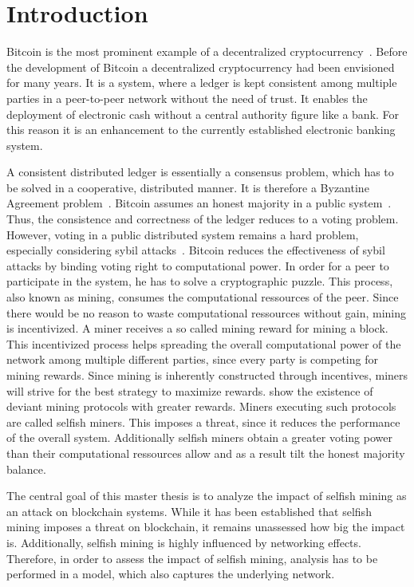 \chapter{Introduction}\label{chap:introduction}
Bitcoin is the most prominent example of a decentralized cryptocurrency~\cite{1}. Before the development of Bitcoin a decentralized cryptocurrency had been envisioned for many years. It is a system, where a ledger is kept consistent among multiple parties in a peer-to-peer network without the need of trust. It enables the deployment of electronic cash without a central authority figure like a bank.
For this reason it is an enhancement to the currently established electronic banking system.

 A consistent distributed ledger is essentially a consensus problem, which has to be solved in a cooperative, distributed manner. It is therefore a Byzantine Agreement problem~\cite{garay2015bitcoin}. Bitcoin assumes an honest majority in a public system~\cite{tschorsch}. Thus, the consistence and correctness of the ledger reduces to a voting problem. However, voting in a public distributed system remains a hard problem, especially considering sybil attacks~\cite{sybil}. Bitcoin reduces the effectiveness of sybil attacks by binding voting right to computational power.
In order for a peer to participate in the system, he has to solve a cryptographic puzzle.
This process, also known as mining, consumes the computational ressources of the peer. Since there would be no reason to waste computational ressources without gain, mining is incentivized. A miner receives a so called mining reward for mining a block. This incentivized process helps spreading the overall computational power of the network among multiple different parties, since every party is competing for mining rewards.
Since mining is inherently constructed through incentives, miners will strive for the best strategy to maximize rewards. \citeauthor{eyal} show the existence of deviant mining protocols with greater rewards. Miners executing such protocols are called selfish miners. This imposes a threat, since it reduces the performance of the overall system. Additionally selfish miners obtain a greater voting power than their computational ressources allow and as a result tilt the honest majority balance.

The central goal of this master thesis is to analyze the impact of selfish mining as an attack on blockchain systems. 
While it has been established that selfish mining imposes a threat on blockchain, it remains unassessed how big the impact is. 
Additionally, selfish mining is highly influenced by networking effects. 
Therefore, in order to assess the impact of selfish mining, analysis has to be performed in a model, which also captures the underlying network.



